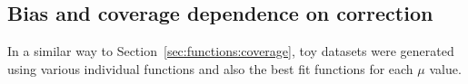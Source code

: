 


\subsection{Bias and coverage dependence on correction}
\label{sec:correction:bias}

In a similar way to Section~\ref{sec:functions:coverage}, toy datasets
were generated using various individual functions and also the best fit
functions for each $\mu$ value.

